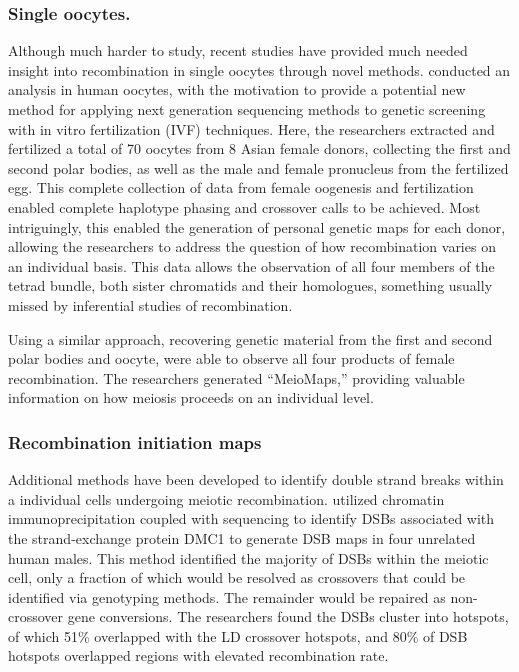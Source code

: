\subsubsection{Single oocytes.}
Although much harder to study, recent studies have provided much needed insight into recombination in single oocytes through novel methods.
\citet{Hou2013} conducted an analysis in human oocytes, with the motivation to provide a potential new method for applying next generation sequencing methods to genetic screening with in vitro fertilization (IVF) techniques.
Here, the researchers extracted and fertilized a total of 70 oocytes from 8 Asian female donors, collecting the first and second polar bodies, as well as the male and female pronucleus from the fertilized egg.
This complete collection of data from female oogenesis and fertilization enabled complete haplotype phasing and crossover calls to be achieved.
Most intriguingly, this enabled the generation of personal genetic maps for each donor, allowing the researchers to address the question of how recombination varies on an individual basis.
This data allows the observation of all four members of the tetrad bundle, both sister chromatids and their homologues, something usually missed by inferential studies of recombination.


Using a similar approach, recovering genetic material from the first and second polar bodies and oocyte, \citet{Ottolini2015} were able to observe all four products of female recombination.
The researchers generated ``MeioMaps,'' providing valuable information on how meiosis proceeds on an individual level.



\subsubsection{Recombination initiation maps}
Additional methods have been developed to identify double strand breaks within a individual cells undergoing meiotic recombination.
\citet{Pratto2014} utilized chromatin immunoprecipitation coupled with sequencing to identify DSBs associated with the strand-exchange protein DMC1 to generate DSB maps in four unrelated human males.
This method identified the majority of DSBs within the meiotic cell, only a fraction of which would be resolved as crossovers that could be identified via genotyping methods.
The remainder would be repaired as non-crossover gene conversions.
The researchers found the DSBs cluster into hotspots, of which 51\% overlapped with the LD crossover hotspots\cite{hapmap2007}, and 80\% of DSB hotspots overlapped regions with elevated recombination rate.


